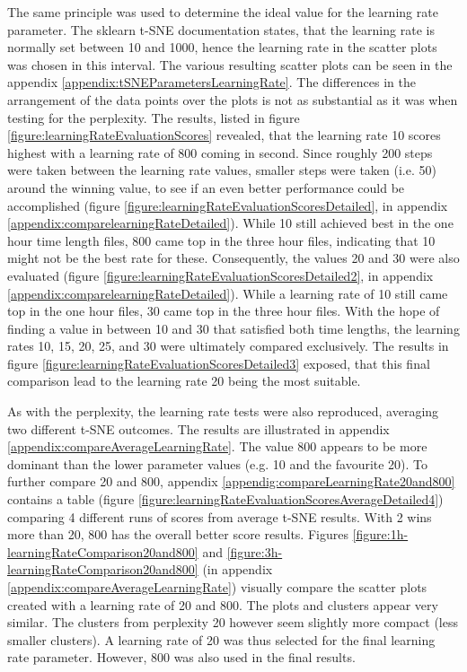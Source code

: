 The same principle was used to determine the ideal value for the learning rate parameter. The sklearn t-SNE documentation states, that the learning rate is normally set between 10 and 1000, hence the learning rate in the scatter plots was chosen in this interval.
The various resulting scatter plots can be seen in the appendix \ref{appendix:tSNEParametersLearningRate}. The differences in the arrangement of the data points over the plots is not as substantial as it was when testing for the perplexity. The results, listed in figure \ref{figure:learningRateEvaluationScores} revealed, that the learning rate 10 scores highest with a learning rate of 800 coming in second. Since roughly 200 steps were taken between the learning rate values, smaller steps were taken (i.e. 50) around the winning value, to see if an even better performance could be accomplished (figure \ref{figure:learningRateEvaluationScoresDetailed}, in appendix \ref{appendix:comparelearningRateDetailed}). While 10 still achieved best in the one hour time length files, 800 came top in the three hour files, indicating that 10 might not be the best rate for these. Consequently, the values 20 and 30 were also evaluated (figure \ref{figure:learningRateEvaluationScoresDetailed2}, in appendix \ref{appendix:comparelearningRateDetailed}). While a learning rate of 10 still came top in the one hour files, 30 came top in the three hour files. With the hope of finding a value in between 10 and 30 that satisfied both time lengths, the learning rates 10, 15, 20, 25, and 30 were ultimately compared exclusively. The results in figure \ref{figure:learningRateEvaluationScoresDetailed3} exposed, that this final comparison lead to the learning rate 20 being the most suitable. 

As with the perplexity, the learning rate tests were also reproduced, averaging two different t-SNE outcomes. The results are illustrated in appendix \ref{appendix:compareAverageLearningRate}. The value 800 appears to be more dominant than the lower parameter values (e.g. 10 and the favourite 20). To further compare 20 and 800, appendix \ref{appendig:compareLearningRate20and800} contains a table (figure \ref{figure:learningRateEvaluationScoresAverageDetailed4}) comparing 4 different runs of scores from average t-SNE results. With 2 wins more than 20, 800 has the overall better score results. Figures \ref{figure:1h-learningRateComparison20and800} and \ref{figure:3h-learningRateComparison20and800} (in appendix \ref{appendix:compareAverageLearningRate}) visually compare the scatter plots created with a learning rate of 20 and 800. The plots and clusters appear very similar. The clusters from perplexity 20 however seem slightly more compact (less smaller clusters). A learning rate of 20 was thus selected for the final learning rate parameter. However, 800 was also used in the final results.


